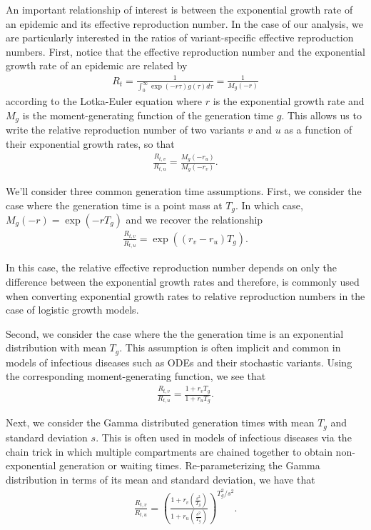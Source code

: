 \documentclass[11pt,oneside,letterpaper]{article}
\begin{document}
An important relationship of interest is between the exponential growth rate of an epidemic and its effective reproduction number.
In the case of our analysis, we are particularly interested in the ratios of variant-specific effective reproduction numbers.
First, notice that the effective reproduction number and the exponential growth rate of an epidemic are related by
\begin{align*}
R_{t} = \frac{1}{\int_{0}^{\infty} \exp(-r\tau)g(\tau)d\tau} = \frac{1}{M_{g}(-r)}
\end{align*}
according to the Lotka-Euler equation \cite{Wallinga2006} where $r$ is the exponential growth rate and $M_{g}$ is the moment-generating function of the generation time $g$.
This allows us to write the relative reproduction number of two variants $v$ and $u$ as a function of their exponential growth rates, so that
\begin{align*}
\frac{R_{t,v}}{R_{t,u}} = \frac{M_{g}(-r_{u})}{M_{g}(-r_{v})}.
\end{align*}

We'll consider three common generation time assumptions. First, we consider the case where the generation time is a point mass at $T_{g}$. In which case, $M_{g}(-r) = \exp(-r T_{g})$ and we recover the relationship
\begin{align*}
\frac{R_{t,v}}{R_{t,u}} = \exp( (r_{v}-r_{u})T_{g}).
\end{align*}

In this case, the relative effective reproduction number depends on only the difference between the exponential growth rates and therefore, is commonly used when converting exponential growth rates to relative reproduction numbers in the case of logistic growth models.

Second, we consider the case where the the generation time is an exponential distribution with mean $T_{g}$. This assumption is often implicit and common in models of infectious diseases such as ODEs and their stochastic variants. Using the corresponding moment-generating function, we see that
\begin{align*}
\frac{R_{t,v}}{R_{t,u}} = \frac{1 + r_{v} T_{g}}{1 + r_{u} T_{g}}.
\end{align*}


Next, we consider the Gamma distributed generation times with mean $T_{g}$ and standard deviation $s$.
This is often used in models of infectious diseases via the chain trick in which multiple compartments are chained together to obtain non-exponential generation or waiting times.
Re-parameterizing the Gamma distribution in terms of its mean and standard deviation, we have that
\begin{align*}
\frac{R_{t,v}}{R_{t,u}} = \left( \frac{1 + r_{v}  \left(\frac{s^{2}}{T_{g}}\right)}{1 + r_{u} \left(\frac{s^{2}}{T_{g}}\right) } \right)^{T_{g}^{2} / s^{2}}.
\end{align*}
\end{document}
